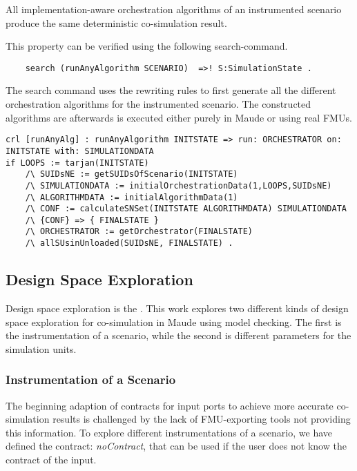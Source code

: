 \begin{lemma}
    All implementation-aware orchestration algorithms of an instrumented scenario produce the same deterministic co-simulation result.
\end{lemma}

This property can be verified using the following search-command.
\begin{lstlisting}
    search (runAnyAlgorithm SCENARIO)  =>! S:SimulationState .
\end{lstlisting}


The search command uses the rewriting rules to first generate all the different orchestration algorithms for the instrumented scenario.
The constructed algorithms are afterwards is executed either purely in Maude or using real FMUs.  

\begin{lstlisting}
crl [runAnyAlg] : runAnyAlgorithm INITSTATE => run: ORCHESTRATOR on: INITSTATE with: SIMULATIONDATA
if LOOPS := tarjan(INITSTATE)
    /\ SUIDsNE := getSUIDsOfScenario(INITSTATE)
    /\ SIMULATIONDATA := initialOrchestrationData(1,LOOPS,SUIDsNE)
    /\ ALGORITHMDATA := initialAlgorithmData(1)
    /\ CONF := calculateSNSet(INITSTATE ALGORITHMDATA) SIMULATIONDATA 
    /\ {CONF} => { FINALSTATE } 
    /\ ORCHESTRATOR := getOrchestrator(FINALSTATE)
    /\ allSUsinUnloaded(SUIDsNE, FINALSTATE) .
\end{lstlisting}

\subsection{Design Space Exploration}
Design space exploration is the .
This work explores two different kinds of design space exploration for co-simulation in Maude using model checking.
The first is the instrumentation of a scenario, while the second is different parameters for the simulation units.  

\subsubsection{Instrumentation of a Scenario}
The beginning adaption of contracts for input ports to achieve more accurate co-simulation results is challenged by the lack of FMU-exporting tools not providing this information. 
To explore different instrumentations of a scenario, we have defined the contract: \textit{noContract}, that can be used if the user does not know the contract of the input.

